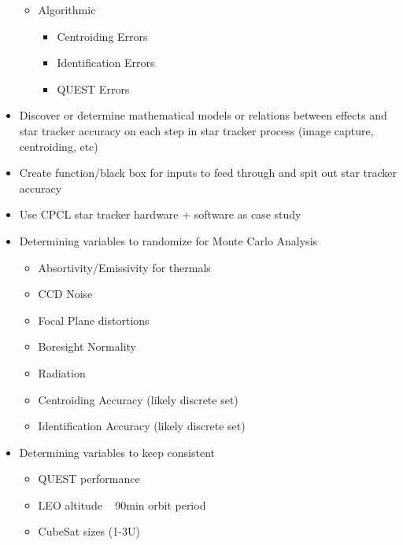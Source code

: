 \begin{itemize}
\begin{itemize}
        \item Algorithmic
        \begin{itemize}
            \item Centroiding Errors 
            \item Identification Errors 
            \item QUEST Errors 
        \end{itemize}
    \end{itemize}
    \item Discover or determine mathematical models or relations between effects and star tracker accuracy on each step in star tracker process (image capture, centroiding, etc)
    \item Create function/black box for inputs to feed through and spit out star tracker accuracy 
    \item Use CPCL star tracker hardware + software as case study
    \item Determining variables to randomize for Monte Carlo Analysis 
    \begin{itemize}
        \item Absortivity/Emissivity for thermals 
        \item CCD Noise 
        \item Focal Plane distortions 
        \item Boresight Normality
        \item Radiation
        \item Centroiding Accuracy (likely discrete set)
        \item Identification Accuracy (likely discrete set)
    \end{itemize}
    \item Determining variables to keep consistent
    \begin{itemize}
        \item QUEST performance 
        \item LEO altitude ~ 90min orbit period 
        \item CubeSat sizes (1-3U)
    \end{itemize}
\end{itemize}

